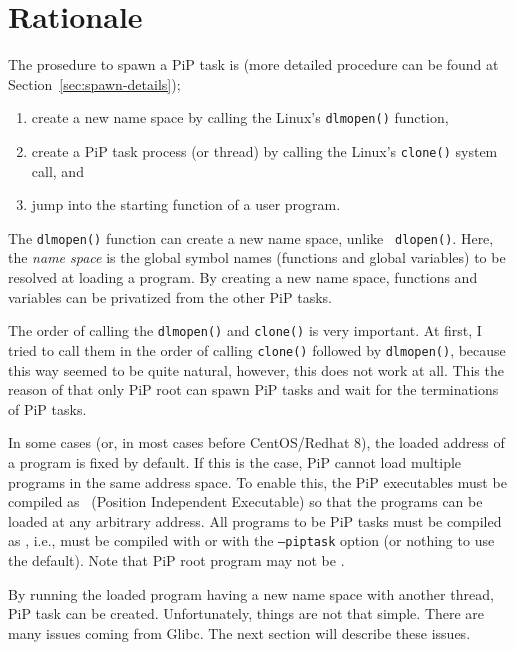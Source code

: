 
\section{Rationale}\label{sec:rationale}

The prosedure to spawn a PiP task is (more detailed procedure can be
found at Section~\ref{sec:spawn-details});

\begin{enumerate}
\item create a new name space by calling the Linux's {\tt dlmopen()}
  function,
\item create a PiP task process (or thread) by calling the Linux's
  {\tt clone()} system call, and 
\item jump into the starting function of a user program.
\end{enumerate}

The {\tt dlmopen()} function can create a new name space, unlike {\tt
  dlopen()}. Here, the {\it name space} is the global symbol names
(functions and global variables) to be resolved at loading a program. By
creating a new name space, functions and variables can be
privatized from the other PiP tasks. 

The order of calling the {\tt dlmopen()} and {\tt clone()} is very
important.  At first, I tried to call them in the order of calling
{\tt clone()} followed by {\tt dlmopen()}, because this way seemed to be
quite natural, however, this does not work at all. This the reason of
that only PiP root can spawn PiP tasks and wait for the terminations
of PiP tasks. 

In some cases (or, in most cases before CentOS/Redhat 8), the loaded
address of a program is fixed by default. If this is the case, PiP
cannot load multiple programs in the same address space. To enable
this, the PiP executables must be compiled as \PIE\ (Position
Independent Executable) so that the programs can be loaded at any
arbitrary address. All programs to be PiP tasks must be compiled as
\PIE, i.e., must be compiled with  or 
with the {\tt --piptask} option (or nothing to use the default). Note
that PiP root program may not be \PIE.  

By running the loaded program having a new name space with another
thread, PiP task can be created. Unfortunately, things are not that
simple. There are many issues coming from Glibc. The next section will
describe these issues. 
